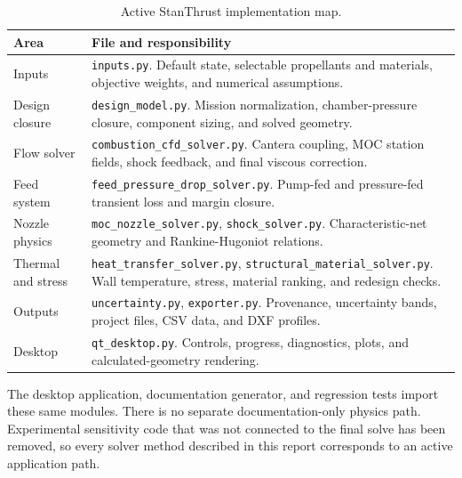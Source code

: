 \documentclass[11pt]{article}
\begin{document}
\begin{table}[H]
\centering
\caption{Active StanThrust implementation map.}
\begin{tabular}{p{}p{}}
\toprule
Area & File and responsibility \\
\midrule
Inputs & \texttt{inputs.py}. Default state, selectable propellants and materials, objective weights, and numerical assumptions. \\
Design closure & \texttt{design\_model.py}. Mission normalization, chamber-pressure closure, component sizing, and solved geometry. \\
Flow solver & \texttt{combustion\_cfd\_solver.py}. Cantera coupling, MOC station fields, shock feedback, and final viscous correction. \\
Feed system & \texttt{feed\_pressure\_drop\_solver.py}. Pump-fed and pressure-fed transient loss and margin closure. \\
Nozzle physics & \texttt{moc\_nozzle\_solver.py}, \texttt{shock\_solver.py}. Characteristic-net geometry and Rankine-Hugoniot relations. \\
Thermal and stress & \texttt{heat\_transfer\_solver.py}, \texttt{structural\_material\_solver.py}. Wall temperature, stress, material ranking, and redesign checks. \\
Outputs & \texttt{uncertainty.py}, \texttt{exporter.py}. Provenance, uncertainty bands, project files, CSV data, and DXF profiles. \\
Desktop & \texttt{qt\_desktop.py}. Controls, progress, diagnostics, plots, and calculated-geometry rendering. \\
\bottomrule
\end{tabular}
\end{table}

The desktop application, documentation generator, and regression tests import these same modules. There is no separate documentation-only physics path. Experimental sensitivity code that was not connected to the final solve has been removed, so every solver method described in this report corresponds to an active application path.
\end{document}
